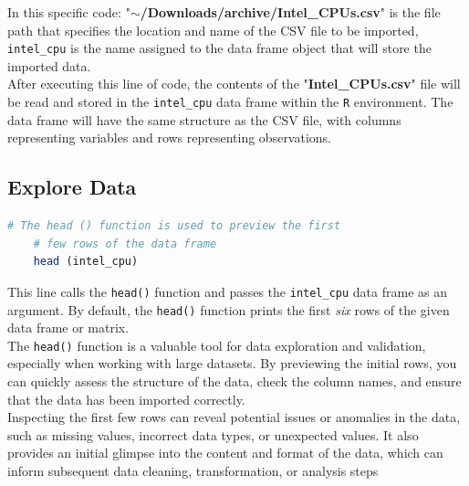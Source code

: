 In this specific code:
"\textbf{$\sim$/Downloads/archive/Intel\_CPUs.csv}" is the file path that specifies the location and name of the CSV file to be imported, \texttt{intel\_cpu} is the name assigned to the data frame object that will store the imported data.\\

After executing this line of code, the contents of the "\textbf{Intel\_CPUs.csv}" file will be read and stored in the \texttt{intel\_cpu} data frame within the \texttt{R} environment. The data frame will have the same structure as the CSV file, with columns representing variables and rows representing observations.

\subsection{Explore Data}
\begin{lstlisting}[language=R]
    # The head () function is used to preview the first 
    # few rows of the data frame
    head (intel_cpu)
\end{lstlisting}

This line calls the \texttt{head()} function and passes the \texttt{intel\_cpu} data frame as an argument. By default, the \texttt{head()} function prints the first \textit{six} rows of the given data frame or matrix.\\

The \texttt{head()} function is a valuable tool for data exploration and validation, especially when working with large datasets. By previewing the initial rows, you can quickly assess the structure of the data, check the column names, and ensure that the data has been imported correctly.\\

Inspecting the first few rows can reveal potential issues or anomalies in the data, such as missing values, incorrect data types, or unexpected values. It also provides an initial glimpse into the content and format of the data, which can inform subsequent data cleaning, transformation, or analysis steps

